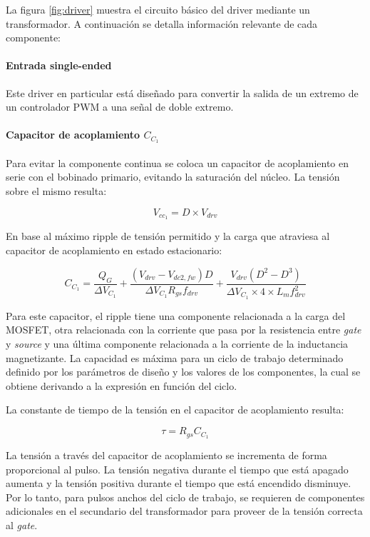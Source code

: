 La figura \ref{fig:driver} muestra el circuito básico del driver mediante un transformador.
A continuación se detalla información relevante de cada componente: 

\paragraph{Entrada single-ended} 

Este driver en particular está diseñado para convertir la salida de un extremo de un controlador PWM a una señal de doble extremo. %

\paragraph{Capacitor de acoplamiento $C_{C_1}$}

Para evitar la componente continua se coloca un capacitor de acoplamiento en serie con el bobinado primario, 
evitando la saturación del núcleo. La tensión sobre el mismo resulta: 

$$ V_{cc_1}=D\times V_{drv} $$

En base al máximo ripple de tensión permitido y la carga que atraviesa al capacitor de acoplamiento en estado estacionario:

$$ C_{C_1}=\frac{Q_G}{\Delta V_{C_1}}+\frac{(V_{drv}-V_{dc2,fw})D}{\Delta V_{C_1}R_{gs}f_{drv}}+\frac{V_{drv}(D^2-D^3)}{\Delta V_{C_1}\times4\times L_mf_{drv}^2} $$

Para este capacitor, el ripple tiene una componente relacionada a la carga del MOSFET, 
otra relacionada con la corriente que pasa por la resistencia entre \textit{gate} y \textit{source} 
y una última componente relacionada a la corriente de la inductancia magnetizante. 
La capacidad es máxima para un ciclo de trabajo determinado definido por los parámetros de diseño 
y los valores de los componentes, la cual se obtiene derivando a la expresión en función del ciclo. 

La constante de tiempo de la tensión en el capacitor de acoplamiento resulta:

$$ \tau=R_{gs}C_{C_1} $$

La tensión a través del capacitor de acoplamiento se incrementa de forma proporcional al pulso. 
La tensión negativa durante el tiempo que está apagado aumenta y la tensión positiva durante el tiempo que está encendido disminuye. 
Por lo tanto, para pulsos anchos del ciclo de trabajo, se requieren de componentes adicionales 
en el secundario del transformador para proveer de la tensión correcta al \textit{gate}. 

